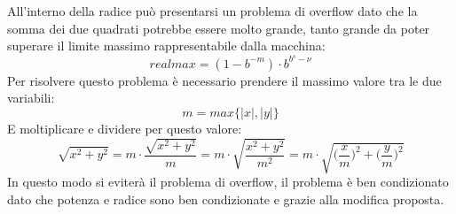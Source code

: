 All'interno della radice può presentarsi un problema di overflow dato che la somma dei due quadrati potrebbe essere molto grande, tanto grande da poter superare il limite massimo rappresentabile dalla macchina:
\[
realmax = (1-b^{-m})\cdot b^{b^{s}-\nu}
\]
Per risolvere questo problema è necessario prendere il massimo valore tra le due variabili:
\[
m = max\{|x|,|y|\}
\]
E moltiplicare e dividere per questo valore:
\[
\sqrt{x^2 + y^2} = m\cdot\frac{\sqrt{x^2+y^2}}{m} = m\cdot\sqrt{\frac{x^2+y^2}{m^2}} = m\cdot\sqrt{\biggl(\frac{x}{m}\biggr)^2+\biggl(\frac{y}{m}\biggr)^2}
\]
In questo modo si eviterà il problema di overflow, il problema è ben \newline condizionato dato che potenza e radice sono ben condizionate e grazie alla modifica proposta.